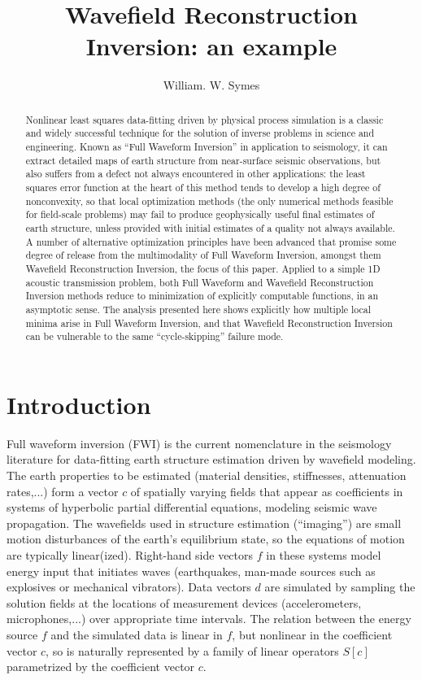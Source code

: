 \address{email: {\tt symes@rice.edu}}
\title{Wavefield Reconstruction Inversion: an example}
\author{William. W. Symes}



\begin{abstract}
  Nonlinear least squares data-fitting driven by physical process
  simulation is a classic and widely successful technique for the
  solution of inverse problems in science and engineering. Known as
  ``Full Waveform Inversion'' in application to seismology, it can
  extract detailed maps of earth structure from near-surface seismic
  observations, but also suffers from a defect not always encountered
  in other applications: the least squares error function at the heart
  of this method tends to develop a high degree of nonconvexity, so
  that local optimization methods (the only numerical methods feasible
  for field-scale problems) may fail to produce geophysically useful
  final estimates of earth structure, unless provided with initial
  estimates of a quality not always available. A number of alternative
  optimization principles have been advanced that promise some degree
  of release from the multimodality of Full Waveform Inversion,
  amongst them Wavefield Reconstruction Inversion, the focus of this
  paper. Applied to a simple 1D acoustic transmission problem, both
  Full Waveform and Wavefield Reconstruction Inversion methods reduce
  to minimization of explicitly computable functions, in an asymptotic
  sense. The analysis presented here shows explicitly how multiple
  local minima arise in Full Waveform Inversion, and that Wavefield
  Reconstruction Inversion can be vulnerable to the same
  ``cycle-skipping'' failure mode.
\end{abstract}

\section{Introduction}

Full waveform inversion (FWI) is the current nomenclature in the
seismology literature for data-fitting earth structure estimation
driven by wavefield modeling. The earth properties to be estimated
(material densities, stiffnesses, attenuation rates,...) form a vector
$c$ of spatially varying fields that appear as coefficients in systems of hyperbolic
partial differential equations, modeling seismic wave
propagation. The wavefields used in structure estimation (``imaging'')
are small motion disturbances of the earth's equilibrium state, so the
equations of motion are typically 
linear(ized). Right-hand side vectors $f$ in these systems model energy
input that initiates waves (earthquakes, man-made sources such as
explosives or mechanical vibrators). Data vectors $d$ are simulated by
sampling the solution fields at the locations of measurement devices
(accelerometers, microphones,...)  over appropriate time
intervals. The relation between the energy source $f$ and the
simulated data is linear in $f$, but nonlinear in the coefficient
vector $c$, so is naturally represented by a family of linear
operators $S[c]$ parametrized by the coefficient vector $c$.

